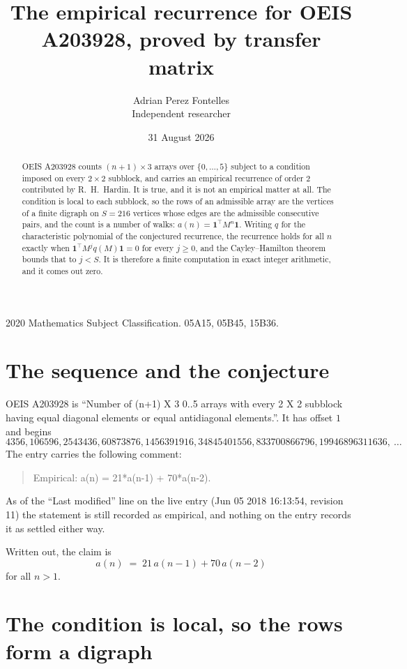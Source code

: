 \documentclass[11pt,a4paper]{article}
\title{The empirical recurrence for OEIS A203928, proved by transfer matrix}
\author{Adrian Perez Fontelles\\ \small Independent researcher}
\date{31 August 2026}
\theoremstyle{plain}
\theoremstyle{definition}
\begin{document}
\maketitle

\begin{abstract}
OEIS A203928 counts $(n+1)\times3$ arrays over $\{0,\dots,5\}$ subject to a condition imposed on
every $2\times2$ subblock, and carries an empirical recurrence of order $2$ contributed
by R.~H.~Hardin. It is true, and it is not an empirical matter at all. The condition is local
to each subblock, so the rows of an admissible array are the vertices of a finite digraph
on $S=216$ vertices whose edges are the admissible consecutive pairs, and the count is a
number of walks: $a(n)=\mathbf{1}^{\!\top}M^{n}\mathbf{1}$. Writing $q$
for the characteristic polynomial of the conjectured recurrence, the recurrence holds for all
$n$ exactly when $\mathbf{1}^{\!\top}M^{j}q(M)\mathbf{1}=0$ for every $j\ge0$, and the
Cayley--Hamilton theorem bounds that to $j<S$. It is therefore a finite computation in exact
integer arithmetic, and it comes out zero.
\end{abstract}

\noindent\small 2020 Mathematics Subject Classification. 05A15, 05B45, 15B36.\normalsize

\section{The sequence and the conjecture}

OEIS A203928 is ``Number of (n+1) X 3 0..5 arrays with every 2 X 2 subblock having equal diagonal elements or equal antidiagonal elements.''. It has offset $1$ and begins
\[
4356, 106596, 2543436, 60873876, 1456391916, 34845401556, 833700866796, 19946896311636,\ \dots
\]
The entry carries the following comment:
\begin{quote}\small
Empirical: a(n) = 21*a(n-1) + 70*a(n-2).
\end{quote}
As of the ``Last modified'' line on the live entry (Jun 05 2018 16:13:54, revision 11) the statement is
still recorded as empirical, and nothing on the entry records it as settled either way.

Written out, the claim is
\begin{equation}\label{eq:conj}
a(n)\;=\;21\,a(n-1) + 70\,a(n-2)
\end{equation}
for all $n>1$.

\section{The condition is local, so the rows form a digraph}
\end{document}
